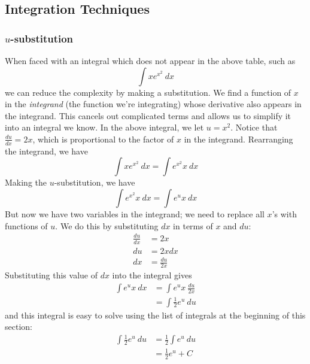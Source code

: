 \subsection{Integration Techniques}

\subsubsection{$u$-substitution}

When faced with an integral which does not appear in the above table, such as
\begin{equation*}
    \int x e^{x^2}\ dx
\end{equation*}
we can reduce the complexity by making a substitution. We find a function of $x$ in the \textit{integrand} (the function we're integrating) 
whose derivative also appears in the integrand. This cancels out complicated terms and allows us to simplify it into an integral we know. 
In the above integral, we let $u = x^2$. Notice that $\frac{du}{dx} = 2x$, which is proportional to the factor of $x$ in the integrand. 
Rearranging the integrand, we have 
\begin{equation*}
    \int x e^{x^2}\ dx = \int e^{x^2} x\ dx
\end{equation*}
Making the $u$-substitution, we have
\begin{equation*}
    \int e^{x^2} x\ dx = \int e^u x\ dx
\end{equation*}
But now we have two variables in the integrand; we need to replace all $x$'s with functions of $u$. We do this by substituting $dx$ in terms of $x$ and $du$:
\begin{equation*}
    \begin{aligned}
        \frac{du}{dx} & = 2x \\ 
        du &= 2x dx \\ 
        dx &= \frac{du}{2x} 
    \end{aligned}
\end{equation*}
Substituting this value of $dx$ into the integral gives
\begin{equation*}
    \begin{aligned}
        \int e^u x\ dx & = \int e^u x\ \frac{du}{2x} \\ 
        & = \int \frac{1}{2} e^u\ du 
    \end{aligned}
\end{equation*}
and this integral is easy to solve using the list of integrals at the beginning of this section:
\begin{equation*}
    \begin{aligned}
         \int \frac{1}{2} e^u\ du  & = \frac{1}{2} \int e^u\ du \\ 
         & = \frac{1}{2} e^u + C
    \end{aligned}
\end{equation*}
